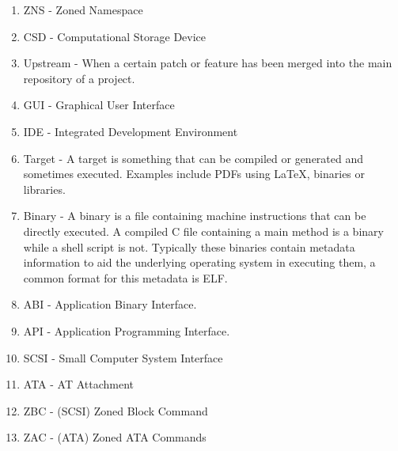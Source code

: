 \documentclass[conference]{IEEEtran}
\begin{document}
\begin{enumerate}
	\item ZNS - Zoned Namespace
	\item CSD - Computational Storage Device
	\item Upstream - When a certain patch or feature has been merged into the
					 main repository of a project.
	\item GUI - Graphical User Interface
	\item IDE - Integrated Development Environment
	\item Target - A target is something that can be compiled or generated and
					 sometimes executed. Examples include PDFs using LaTeX,
					 binaries or libraries.
	\item Binary   - A binary is a file containing machine instructions that can
					 be directly executed. A compiled C file containing a main
					 method is a binary while a shell script is not. Typically
					 these binaries contain metadata information to aid the
					 underlying operating system in executing them, a common
					 format for this metadata is ELF.
	\item ABI      - Application Binary Interface.
	\item API      - Application Programming Interface.
	\item SCSI     - Small Computer System Interface
	\item ATA      - AT Attachment
	\item ZBC      - (SCSI) Zoned Block Command
	\item ZAC      - (ATA) Zoned ATA Commands
\end{enumerate}





\end{document}
